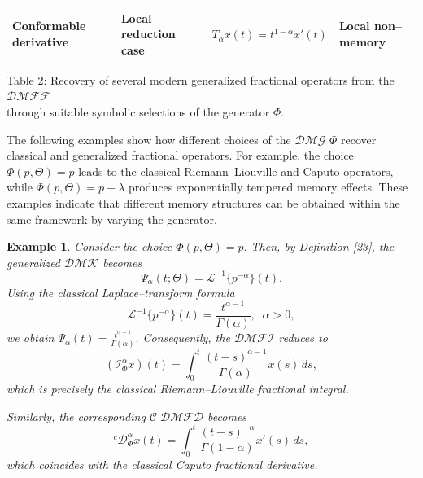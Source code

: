 \documentclass[11pt]{article}
\numberwithin{equation}{section}
\newtheorem{example}[definition]{Example}
\begin{document}
\begin{table}[H]
\begin{tabular}{|p{3cm}|p{3.2cm}|p{4.5cm}|p{2.3cm}|}
Conformable derivative \cite{Khalil2014} &
Local reduction case &
$\displaystyle
T_\alpha x(t)
=
t^{1-\alpha}x'(t)
$ &
Local non--memory
\\
\hline

\end{tabular}

\vspace{1mm}

{\footnotesize
Table 2: Recovery of several modern generalized fractional operators from the  $\mathcal{DMFF}$ \\through suitable symbolic selections of the generator \(\Phi\).
}

\label{Tab2}

\end{table}

\noindent
\noindent
The following examples show how different choices of the $\mathcal{DMG}$
\(
\Phi
\)
recover classical and generalized fractional operators. For example, the choice
\(
\Phi(p,\Theta)=p
\)
leads to the classical Riemann--Liouville and Caputo operators, while
\(
\Phi(p,\Theta)=p+\lambda
\)
produces exponentially tempered memory effects. These examples indicate that different memory structures can be obtained within the same framework by varying the generator.

\begin{example}
Consider the choice
\(
\Phi(p,\Theta)=p.
\)
Then, by Definition \ref{23}, the generalized $\mathcal{DMK}$ becomes
\[
\Psi_\alpha(t;\Theta)
=
\mathcal L^{-1}\{p^{-\alpha}\}(t).
\]
Using the classical Laplace--transform formula
\[
\mathcal L^{-1}\{p^{-\alpha}\}(t)
=
\frac{t^{\alpha-1}}{\Gamma(\alpha)},
\;\; \alpha>0,
\]
we obtain
\(
\Psi_\alpha(t)
=
\frac{t^{\alpha-1}}{\Gamma(\alpha)}.
\)
Consequently, the $\mathcal{DMFI}$ reduces to
\[
(\mathcal I_\Phi^\alpha x)(t)
=
\int_0^t
\frac{(t-s)^{\alpha-1}}{\Gamma(\alpha)}
x(s)\,ds,
\]
which is precisely the classical Riemann--Liouville fractional integral.

Similarly, the corresponding $\mathcal{C\;DMFD}$ becomes
\[
{}^c\mathcal D_\Phi^\alpha x(t)
=
\int_0^t
\frac{(t-s)^{-\alpha}}{\Gamma(1-\alpha)}
x'(s)\,ds,
\]
which coincides with the classical Caputo fractional derivative.


\end{example}
\end{document}
